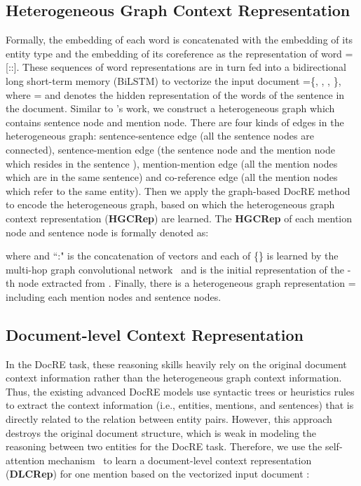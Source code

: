 \documentclass[11pt,a4paper]{article}
\begin{document}
\subsection{Heterogeneous Graph Context Representation}
\label{sec3-1}
Formally, the embedding of each word  is concatenated with the embedding of its entity type  and the embedding of its coreference  as the representation of word =[::].
These sequences of word representations are in turn fed into a bidirectional long short-term memory (BiLSTM) to vectorize the input document =\{, , , \}, where  =  and  denotes the hidden representation of the  words of the  sentence in the document.
Similar to  \citeauthor{zeng-etal-2020-double}'s work, we construct a heterogeneous graph which contains sentence node and mention node.
There are four kinds of edges in the heterogeneous graph: sentence-sentence edge (all the sentence nodes are connected), sentence-mention edge (the sentence node and the mention node which resides in the sentence ), mention-mention edge (all the mention nodes which are in the same sentence) and co-reference edge (all the mention nodes which refer to the same entity).
Then we apply the graph-based DocRE method \cite{zeng-etal-2020-double} to encode the heterogeneous graph, based on which the heterogeneous graph context representation (\textbf{HGCRep}) are learned.
The \textbf{HGCRep} of each mention node and sentence node  is formally denoted as:

where  and ``:" is the concatenation of vectors and each of \{\} is learned by the multi-hop graph convolutional network~\cite{zeng-etal-2020-double} and  is the initial representation of the -th node extracted from .
Finally, there is a heterogeneous graph representation = including each mention nodes and sentence nodes.

\subsection{Document-level Context Representation}
\label{sec3-2}
In the DocRE task, these reasoning skills heavily rely on the original document context information rather than the heterogeneous graph context information.
Thus, the existing advanced DocRE models use syntactic trees or heuristics rules to extract the context information (i.e., entities, mentions, and sentences) that is directly related to the relation between entity pairs.
However, this approach destroys the original document structure, which is weak in modeling the reasoning between two entities for the DocRE task.
Therefore, we use the self-attention mechanism~\cite{NIPS2017_7181} to learn a document-level context representation (\textbf{DLCRep})  for one mention based on the vectorized input document :
\end{document}
